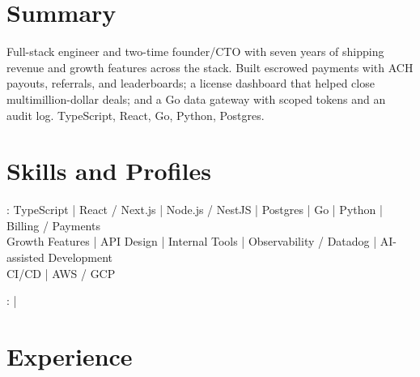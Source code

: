 \documentclass[print]{jack-resume}
\begin{document}
\pagecolor{darkmodeBackground}


\begin{minipage}[t][1cm][t]{.03\textwidth}
    \hfill
\end{minipage}

\section{Summary}
Full-stack engineer and two-time founder/CTO with seven years of shipping revenue and growth features across the stack. Built escrowed payments with ACH payouts, referrals, and leaderboards; a license dashboard that helped close multimillion-dollar deals; and a Go data gateway with scoped tokens and an audit log. TypeScript, React, Go, Python, Postgres.
\sectionsep

\section{Skills and Profiles}
:
TypeScript \hfill | \hfill
React / Next.js \hfill | \hfill
Node.js / NestJS \hfill | \hfill
Postgres \hfill | \hfill
Go \hfill | \hfill
Python \hfill | \hfill
Billing / Payments \\
\hspace{1.0cm} Growth Features \hfill | \hfill
API Design \hfill | \hfill
Internal Tools \hfill | \hfill
Observability / Datadog \hfill | \hfill
AI-assisted Development \\
\hspace{1.0cm} CI/CD \hfill | \hfill
AWS / GCP \\

\raggedright{
    :
      \href{https://www.linkedin.com/in/jack-sturtevant/}{ \ExternalLink} |
     \href{https://github.com/jacksturt}{ \ExternalLink}}

\section{Experience}
\end{document}
